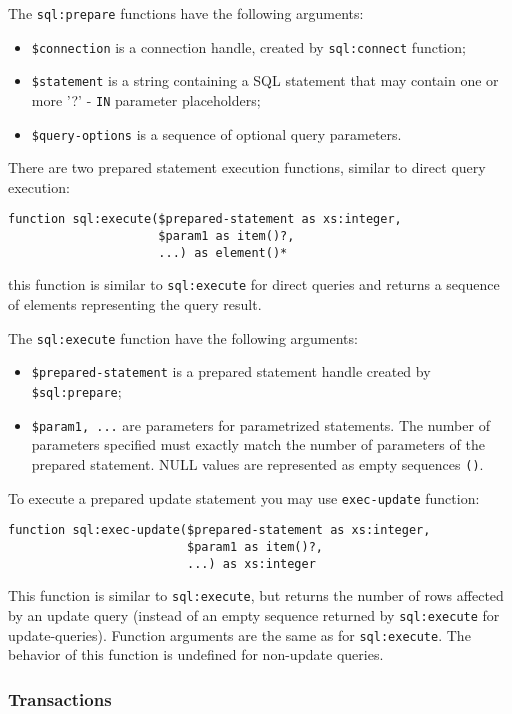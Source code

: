 \documentclass[a4paper,12pt]{article}
\newenvironment{citemize}
{\begin{itemize}
  \setlength{\itemsep}{0pt}
  \setlength{\parskip}{0pt}
  \setlength{\parsep}{0pt}}
{\end{itemize}}
\begin{document}
The \verb!sql:prepare! functions have the following arguments:

\begin{citemize}
\item \verb!$connection! is a connection handle, created by \verb!sql:connect!
function;
\item \verb!$statement! is a string containing a SQL statement that may
contain one or more '?' - \verb!IN! parameter placeholders;
\item \verb!$query-options! is a sequence of optional query parameters.
\end{citemize}

There are two prepared statement execution functions, similar to direct
query execution:

\begin{verbatim}
function sql:execute($prepared-statement as xs:integer,
                     $param1 as item()?,
                     ...) as element()*
\end{verbatim}
this function is similar to \verb!sql:execute! for direct queries and returns a
sequence of elements representing the query result.

The \verb!sql:execute! function have the following arguments:

\begin{citemize}
\item\verb!$prepared-statement! is a prepared statement handle created by
\verb!$sql:prepare!;
\item\verb!$param1, ...! are parameters for parametrized
statements. The number of parameters specified must exactly match the number
of parameters of the prepared statement. NULL values are represented as empty
sequences \verb!()!.
\end{citemize}

To execute a prepared update statement you may use \verb!exec-update! function:
\begin{verbatim}
function sql:exec-update($prepared-statement as xs:integer,
                         $param1 as item()?,
                         ...) as xs:integer
\end{verbatim}
This function is similar to \verb!sql:execute!, but returns the number of rows
affected by an update query (instead of an empty sequence returned by
\verb!sql:execute! for update-queries). Function arguments are the same as for
\verb!sql:execute!. The behavior of this function is undefined for non-update
queries.


\subsubsection*{Transactions}
\end{document}
